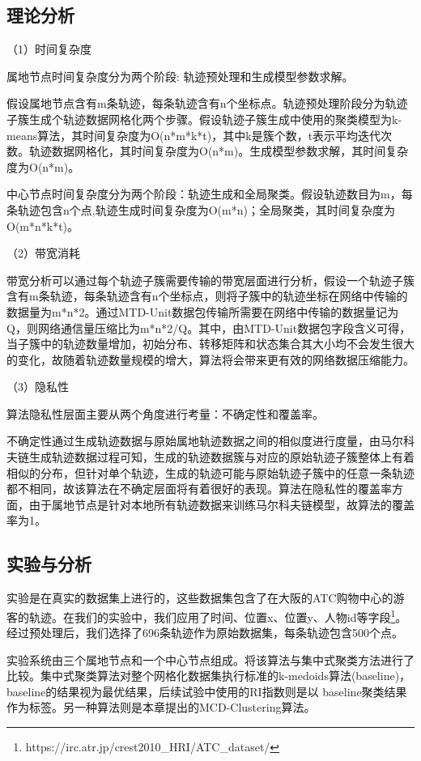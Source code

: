 \subsection{理论分析}

（1）时间复杂度

属地节点时间复杂度分为两个阶段: 轨迹预处理和生成模型参数求解。

假设属地节点含有m条轨迹，每条轨迹含有n个坐标点。轨迹预处理阶段分为轨迹子簇生成个轨迹数据网格化两个步骤。假设轨迹子簇生成中使用的聚类模型为k-means算法，其时间复杂度为O(n*m*k*t)，其中k是簇个数，t表示平均迭代次数。轨迹数据网格化，其时间复杂度为O(n*m)。生成模型参数求解，其时间复杂度为O(n*m)。

中心节点时间复杂度分为两个阶段：轨迹生成和全局聚类。假设轨迹数目为m，每条轨迹包含n个点,轨迹生成时间复杂度为O(m*n)；全局聚类，其时间复杂度为O(m*n*k*t)。

（2）带宽消耗

带宽分析可以通过每个轨迹子簇需要传输的带宽层面进行分析，假设一个轨迹子簇含有m条轨迹，每条轨迹含有n个坐标点，则将子簇中的轨迹坐标在网络中传输的数据量为m*n*2。通过MTD-Unit数据包传输所需要在网络中传输的数据量记为Q，则网络通信量压缩比为m*n*2/Q。其中，由MTD-Unit数据包字段含义可得，当子簇中的轨迹数量增加，初始分布、转移矩阵和状态集合其大小均不会发生很大的变化，故随着轨迹数量规模的增大，算法将会带来更有效的网络数据压缩能力。

（3）隐私性

算法隐私性层面主要从两个角度进行考量：不确定性和覆盖率。

不确定性通过生成轨迹数据与原始属地轨迹数据之间的相似度进行度量，由马尔科夫链生成轨迹数据过程可知，生成的轨迹数据簇与对应的原始轨迹子簇整体上有着相似的分布，但针对单个轨迹，生成的轨迹可能与原始轨迹子簇中的任意一条轨迹都不相同，故该算法在不确定层面将有着很好的表现。算法在隐私性的覆盖率方面，由于属地节点是针对本地所有轨迹数据来训练马尔科夫链模型，故算法的覆盖率为1。

\subsection{实验与分析}

实验是在真实的数据集上进行的，这些数据集包含了在大阪的ATC购物中心的游客的轨迹。在我们的实验中，我们应用了时间、位置x、位置y、人物id等字段\footnote[1]{https://irc.atr.jp/crest2010_HRI/ATC_dataset/}。经过预处理后，我们选择了696条轨迹作为原始数据集，每条轨迹包含500个点。

实验系统由三个属地节点和一个中心节点组成。将该算法与集中式聚类方法进行了比较。集中式聚类算法对整个网格化数据集执行标准的k-medoids算法(baseline)， baseline的结果视为最优结果，后续试验中使用的RI指数则是以 baseline聚类结果作为标签。另一种算法则是本章提出的MCD-Clustering算法。

